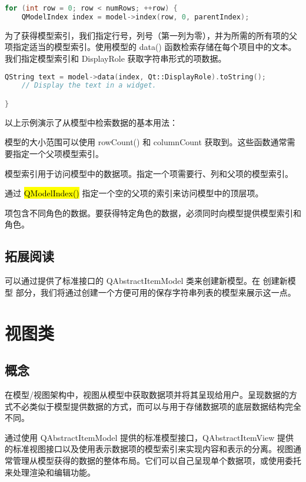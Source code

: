 \begin{lstlisting}[language=C++]
for (int row = 0; row < numRows; ++row) {
    QModelIndex index = model->index(row, 0, parentIndex);
\end{lstlisting}

为了获得模型索引，我们指定行号，列号（第一列为零），并为所需的所有项的父项指定适当的模型索引。使用模型的 data() 函数检索存储在每个项目中的文本。我们指定模型索引和 DisplayRole 获取字符串形式的项数据。

\begin{lstlisting}[language=C++]
QString text = model->data(index, Qt::DisplayRole).toString();
    // Display the text in a widget.

}
\end{lstlisting}

以上示例演示了从模型中检索数据的基本用法：

\begin{compactitem}[\arr]
\item 模型的大小范围可以使用 rowCount() 和 columnCount 获取到。这些函数通常需要指定一个父项模型索引。
\item 模型索引用于访问模型中的数据项。指定一个项需要行、列和父项的模型索引。
\item 通过 \hl{QModelIndex()} 指定一个空的父项的索引来访问模型中的顶层项。
\item 项包含不同角色的数据。要获得特定角色的数据，必须同时向模型提供模型索引和角色。
\end{compactitem}


\subsection{拓展阅读}

可以通过提供了标准接口的 QAbstractItemModel 类来创建新模型。在 创建新模型 部分，我们将通过创建一个方便可用的保存字符串列表的模型来展示这一点。

\section{视图类}
\subsection{概念}

在模型/视图架构中，视图从模型中获取数据项并将其呈现给用户。呈现数据的方式不必类似于模型提供数据的方式，而可以与用于存储数据项的底层数据结构完全不同。

通过使用 QAbstractItemModel 提供的标准模型接口，QAbstractItemView 提供的标准视图接口以及使用表示数据项的模型索引来实现内容和表示的分离。视图通常管理从模型获得的数据的整体布局。它们可以自己呈现单个数据项，或使用委托来处理渲染和编辑功能。

